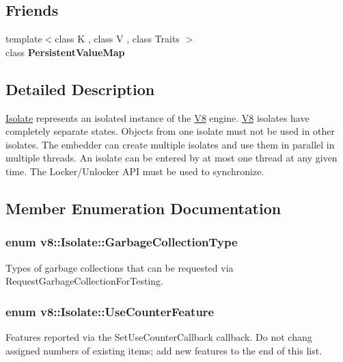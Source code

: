 \subsection*{Friends}
\begin{DoxyCompactItemize}
\item 
\hypertarget{classv8_1_1Isolate_a401e5cd2db49a67497042617f01fdbc2}{}{\footnotesize template$<$class K , class V , class Traits $>$ }\\class {\bfseries Persistent\+Value\+Map}\label{classv8_1_1Isolate_a401e5cd2db49a67497042617f01fdbc2}

\end{DoxyCompactItemize}


\subsection{Detailed Description}
\hyperlink{classv8_1_1Isolate}{Isolate} represents an isolated instance of the \hyperlink{classv8_1_1V8}{V8} engine. \hyperlink{classv8_1_1V8}{V8} isolates have completely separate states. Objects from one isolate must not be used in other isolates. The embedder can create multiple isolates and use them in parallel in multiple threads. An isolate can be entered by at most one thread at any given time. The Locker/\+Unlocker A\+P\+I must be used to synchronize. 

\subsection{Member Enumeration Documentation}
\hypertarget{classv8_1_1Isolate_a5ae00cc99d8aca148c6f5f9698c432c9}{}
\subsubsection[{Garbage\+Collection\+Type}]{\setlength{\rightskip}{0pt plus 5cm}enum {\bf v8\+::\+Isolate\+::\+Garbage\+Collection\+Type}}\label{classv8_1_1Isolate_a5ae00cc99d8aca148c6f5f9698c432c9}
Types of garbage collections that can be requested via Request\+Garbage\+Collection\+For\+Testing. \hypertarget{classv8_1_1Isolate_aed6909379c3f2820cb3084710b73385d}{}
\subsubsection[{Use\+Counter\+Feature}]{\setlength{\rightskip}{0pt plus 5cm}enum {\bf v8\+::\+Isolate\+::\+Use\+Counter\+Feature}}\label{classv8_1_1Isolate_aed6909379c3f2820cb3084710b73385d}
Features reported via the Set\+Use\+Counter\+Callback callback. Do not chang assigned numbers of existing items; add new features to the end of this list. 

